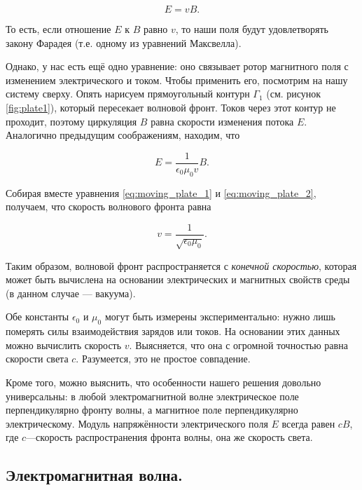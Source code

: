 \documentclass[12pt,a4paper]{article}
\numberwithin{equation}{section}
\numberwithin{equation}{section}
\newcommand{\eps}{\epsilon}
\begin{document}
\begin{equation}
  \label{eq:moving_plate_1}
  E = v B.
\end{equation}

То есть, если отношение $E$ к $B$ равно $v$, то наши поля будут
удовлетворять закону Фарадея (т.е. одному из уравнений Максвелла). 

Однако, у нас есть ещё одно уравнение: оно связывает ротор магнитного
поля с изменением электрического и током. Чтобы применить его,
посмотрим на нашу систему сверху. Опять нарисуем прямоугольный контурн
$\Gamma_1$ (см. рисунок \ref{fig:plate1}), который пересекает волновой
фронт. Токов через этот контур не проходит, поэтому циркуляция $B$
равна скорости изменения потока $E$. Аналогично предыдущим
соображениям, находим, что

\begin{equation}
  \label{eq:moving_plate_2}
  E = \frac{1}{\eps_0 \mu_0 v} B.
\end{equation}

Собирая вместе уравнения \eqref{eq:moving_plate_1} и
\eqref{eq:moving_plate_2}, получаем, что скорость волнового фронта
равна 

\begin{equation}
  \label{eq:velocity_front}
  v = \frac{1}{\sqrt{\eps_0 \mu_0}}.
\end{equation}

Таким образом, волновой фронт распространяется с \textit{конечной
  скоростью}, которая может быть вычислена на основании электрических
и магнитных свойств среды (в данном случае --- вакуума). 

Обе константы $\eps_0$ и $\mu_0$ могут быть измерены
экспериментально: нужно лишь померять силы взаимодействия зарядов или
токов. На основании этих данных можно вычислить скорость
$v$. Выясняется, что она с огромной точностью равна скорости света
$c$. Разумеется, это не простое совпадение. 

Кроме того, можно выяснить, что особенности нашего решения довольно
универсальны: в любой электромагнитной волне электрическое поле
перпендикулярно фронту волны, а магнитное поле перпендикулярно
электрическому. Модуль напряжённости электрического поля $E$ всегда
равен $cB$, где $c$---скорость распространения фронта волны, она же
скорость света. 

\subsection{Электромагнитная волна. }
\label{sec:em_wave}
\end{document}
